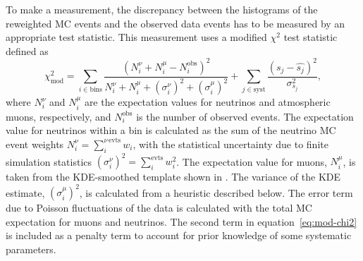To make a measurement, the discrepancy between the histograms of the reweighted MC events and the observed data events has to be measured by an appropriate test statistic. This measurement uses a modified $\chi^2$ test statistic defined as
\begin{equation}
\chi^2_{\mathrm{mod}} = \sum_{i \in \mathrm{bins}}^{}\frac{(N^{\nu}_i + N^{\mu}_i - N^{\mathrm{obs}}_i)^2}{N^{\nu}_i + N^{\mu}_i + (\sigma^{\nu}_i)^2 + (\sigma^{\mu}_i)^2} + \sum_{j \in \mathrm{syst}}^{}\frac{(s_j - \hat{s_j})^2}{\sigma^2_{s_j}},
\label{eq:mod-chi2}
\end{equation}
\noindent where $N^{\nu}_i$ and $N^{\mu}_i$ are the expectation values for neutrinos and atmospheric muons, respectively, and $N^{\mathrm{obs}}_i$ is the number of observed events. The expectation value for neutrinos within a bin is calculated as the sum of the neutrino MC event weights $N^{\nu}_i = \sum_{i}^{\nu\,\mathrm{evts}} w_i$, with the statistical uncertainty due to finite simulation statistics $(\sigma^{\nu}_i)^2 = \sum_{i}^{\mathrm{evts}} w_i^2$. The expectation value for muons, $N^{\mu}_i$, is taken from the KDE-smoothed template shown in . The variance of the KDE estimate, $(\sigma^{\mu}_i)^2$, is calculated from a heuristic described below. The error term due to Poisson fluctuations of the data is calculated with the total MC expectation for muons and neutrinos. The second term in equation~\ref{eq:mod-chi2} is included as a penalty term to account for prior knowledge of some systematic parameters. 

